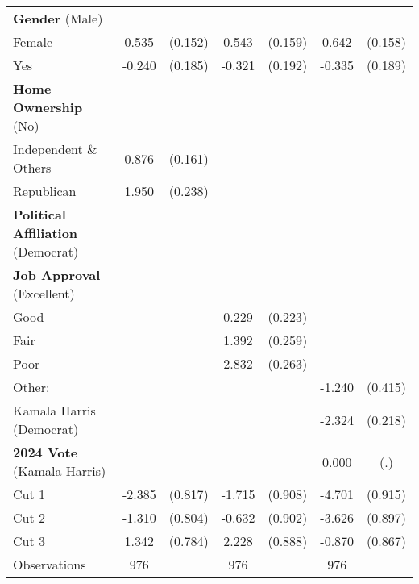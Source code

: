 \begin{table}[htbp]
\begin{tabular}{l*{3}{cc}}
\textbf{Gender} (Male)& & & & & & \\
Female              &       0.535\sym{***}&     (0.152)&       0.543\sym{***}&     (0.159)&       0.642\sym{***}&     (0.158)\\
Yes                 &      -0.240         &     (0.185)&      -0.321\sym{*}  &     (0.192)&      -0.335\sym{*}  &     (0.189)\\
\textbf{Home Ownership} (No)& & & & & & \\
Independent \& Others&       0.876\sym{***}&     (0.161)&                     &            &                     &            \\
Republican          &       1.950\sym{***}&     (0.238)&                     &            &                     &            \\
\textbf{Political Affiliation} (Democrat)& & & & & & \\
\textbf{Job Approval} (Excellent)& & & & & & \\
Good                &                     &            &       0.229         &     (0.223)&                     &            \\
Fair                &                     &            &       1.392\sym{***}&     (0.259)&                     &            \\
Poor                &                     &            &       2.832\sym{***}&     (0.263)&                     &            \\
Other:              &                     &            &                     &            &      -1.240\sym{***}&     (0.415)\\
Kamala Harris (Democrat)&                     &            &                     &            &      -2.324\sym{***}&     (0.218)\\
\textbf{2024 Vote} (Kamala Harris)&                     &            &                     &            &       0.000         &         (.)\\
Cut 1               &      -2.385\sym{***}&     (0.817)&      -1.715\sym{*}  &     (0.908)&      -4.701\sym{***}&     (0.915)\\
Cut 2               &      -1.310         &     (0.804)&      -0.632         &     (0.902)&      -3.626\sym{***}&     (0.897)\\
Cut 3               &       1.342\sym{*}  &     (0.784)&       2.228\sym{**} &     (0.888)&      -0.870         &     (0.867)\\
\hline
Observations        &         976         &            &         976         &            &         976         &            \\

\end{tabular}
\end{table}
